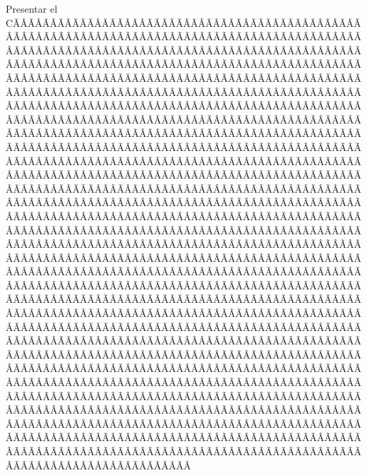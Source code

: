 \begin{sumilla}
\begin{objetivosdelcurso}
\begin{objetivosdelcurso}
\item  Presentar el CÃÂÃÂÃÂÃÂÃÂÃÂÃÂÃÂÃÂÃÂÃÂÃÂÃÂÃÂÃÂÃÂÃÂÃÂÃÂÃÂÃÂÃÂÃÂÃÂÃÂÃÂÃÂÃÂÃÂÃÂÃÂÃÂÃÂÃÂÃÂÃÂÃÂÃÂÃÂÃÂÃÂÃÂÃÂÃÂÃÂÃÂÃÂÃÂÃÂÃÂÃÂÃÂÃÂÃÂÃÂÃÂÃÂÃÂÃÂÃÂÃÂÃÂÃÂÃÂÃÂÃÂÃÂÃÂÃÂÃÂÃÂÃÂÃÂÃÂÃÂÃÂÃÂÃÂÃÂÃÂÃÂÃÂÃÂÃÂÃÂÃÂÃÂÃÂÃÂÃÂÃÂÃÂÃÂÃÂÃÂÃÂÃÂÃÂÃÂÃÂÃÂÃÂÃÂÃÂÃÂÃÂÃÂÃÂÃÂÃÂÃÂÃÂÃÂÃÂÃÂÃÂÃÂÃÂÃÂÃÂÃÂÃÂÃÂÃÂÃÂÃÂÃÂÃÂÃÂÃÂÃÂÃÂÃÂÃÂÃÂÃÂÃÂÃÂÃÂÃÂÃÂÃÂÃÂÃÂÃÂÃÂÃÂÃÂÃÂÃÂÃÂÃÂÃÂÃÂÃÂÃÂÃÂÃÂÃÂÃÂÃÂÃÂÃÂÃÂÃÂÃÂÃÂÃÂÃÂÃÂÃÂÃÂÃÂÃÂÃÂÃÂÃÂÃÂÃÂÃÂÃÂÃÂÃÂÃÂÃÂÃÂÃÂÃÂÃÂÃÂÃÂÃÂÃÂÃÂÃÂÃÂÃÂÃÂÃÂÃÂÃÂÃÂÃÂÃÂÃÂÃÂÃÂÃÂÃÂÃÂÃÂÃÂÃÂÃÂÃÂÃÂÃÂÃÂÃÂÃÂÃÂÃÂÃÂÃÂÃÂÃÂÃÂÃÂÃÂÃÂÃÂÃÂÃÂÃÂÃÂÃÂÃÂÃÂÃÂÃÂÃÂÃÂÃÂÃÂÃÂÃÂÃÂÃÂÃÂÃÂÃÂÃÂÃÂÃÂÃÂÃÂÃÂÃÂÃÂÃÂÃÂÃÂÃÂÃÂÃÂÃÂÃÂÃÂÃÂÃÂÃÂÃÂÃÂÃÂÃÂÃÂÃÂÃÂÃÂÃÂÃÂÃÂÃÂÃÂÃÂÃÂÃÂÃÂÃÂÃÂÃÂÃÂÃÂÃÂÃÂÃÂÃÂÃÂÃÂÃÂÃÂÃÂÃÂÃÂÃÂÃÂÃÂÃÂÃÂÃÂÃÂÃÂÃÂÃÂÃÂÃÂÃÂÃÂÃÂÃÂÃÂÃÂÃÂÃÂÃÂÃÂÃÂÃÂÃÂÃÂÃÂÃÂÃÂÃÂÃÂÃÂÃÂÃÂÃÂÃÂÃÂÃÂÃÂÃÂÃÂÃÂÃÂÃÂÃÂÃÂÃÂÃÂÃÂÃÂÃÂÃÂÃÂÃÂÃÂÃÂÃÂÃÂÃÂÃÂÃÂÃÂÃÂÃÂÃÂÃÂÃÂÃÂÃÂÃÂÃÂÃÂÃÂÃÂÃÂÃÂÃÂÃÂÃÂÃÂÃÂÃÂÃÂÃÂÃÂÃÂÃÂÃÂÃÂÃÂÃÂÃÂÃÂÃÂÃÂÃÂÃÂÃÂÃÂÃÂÃÂÃÂÃÂÃÂÃÂÃÂÃÂÃÂÃÂÃÂÃÂÃÂÃÂÃÂÃÂÃÂÃÂÃÂÃÂÃÂÃÂÃÂÃÂÃÂÃÂÃÂÃÂÃÂÃÂÃÂÃÂÃÂÃÂÃÂÃÂÃÂÃÂÃÂÃÂÃÂÃÂÃÂÃÂÃÂÃÂÃÂÃÂÃÂÃÂÃÂÃÂÃÂÃÂÃÂÃÂÃÂÃÂÃÂÃÂÃÂÃÂÃÂÃÂÃÂÃÂÃÂÃÂÃÂÃÂÃÂÃÂÃÂÃÂÃÂÃÂÃÂÃÂÃÂÃÂÃÂÃÂÃÂÃÂÃÂÃÂÃÂÃÂÃÂÃÂÃÂÃÂÃÂÃÂÃÂÃÂÃÂÃÂÃÂÃÂÃÂÃÂÃÂÃÂÃÂÃÂÃÂÃÂÃÂÃÂÃÂÃÂÃÂÃÂÃÂÃÂÃÂÃÂÃÂÃÂÃÂÃÂÃÂÃÂÃÂÃÂÃÂÃÂÃÂÃÂÃÂÃÂÃÂÃÂÃÂÃÂÃÂÃÂÃÂÃÂÃÂÃÂÃÂÃÂÃÂÃÂÃÂÃÂÃÂÃÂÃÂÃÂÃÂÃÂÃÂÃÂÃÂÃÂÃÂÃÂÃÂÃÂÃÂÃÂÃÂÃÂÃÂÃÂÃÂÃÂÃÂÃÂÃÂÃÂÃÂÃÂÃÂÃÂÃÂÃÂÃÂÃÂÃÂÃÂÃÂÃÂÃÂÃÂÃÂÃÂÃÂÃÂÃÂÃÂÃÂÃÂÃÂÃÂÃÂÃÂÃÂÃÂÃÂÃÂÃÂÃÂÃÂÃÂÃÂÃÂÃÂÃÂÃÂÃÂÃÂÃÂÃÂÃÂÃÂÃÂÃÂÃÂÃÂÃÂÃÂÃÂÃÂÃÂÃÂÃÂÃÂÃÂÃÂÃÂÃÂÃÂÃÂÃÂÃÂÃÂÃÂÃÂÃÂÃÂÃÂÃÂÃÂÃÂÃÂÃÂÃÂÃÂÃÂÃÂÃÂÃÂÃÂÃÂÃÂÃÂÃÂÃÂÃÂÃÂÃÂÃÂÃÂÃÂÃÂÃÂÃÂÃÂÃÂÃÂÃÂÃÂÃÂÃÂÃÂÃÂÃÂÃÂÃÂÃÂÃÂÃÂÃÂÃÂÃÂÃÂÃÂÃÂÃÂÃÂÃÂÃÂÃÂÃÂÃÂÃÂÃÂÃÂÃÂÃÂÃÂÃÂÃÂÃÂÃÂÃÂÃÂÃÂÃÂÃÂÃÂÃÂÃÂÃÂÃÂÃÂÃÂÃÂÃÂÃÂÃÂÃÂÃÂÃÂÃÂÃÂÃÂÃÂÃÂÃÂÃÂÃÂÃÂÃÂÃÂÃÂÃÂÃÂÃÂÃÂÃÂÃÂÃÂÃÂÃÂÃÂÃÂÃÂÃÂÃÂÃÂÃÂÃÂÃÂÃÂÃÂÃÂÃÂÃÂÃÂÃÂÃÂÃÂÃÂÃÂÃÂÃÂÃÂÃÂÃÂÃÂÃÂÃÂ
\end{objetivosdelcurso}
\end{objetivosdelcurso}
\end{sumilla}
